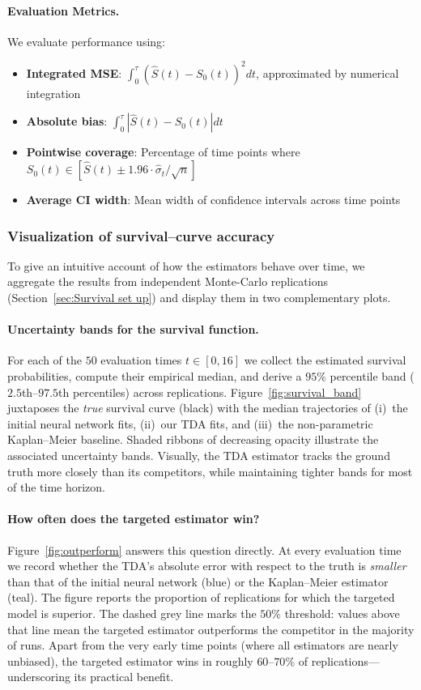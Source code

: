 \documentclass{article}
\theoremstyle{remark}
\begin{document}
\paragraph{Evaluation Metrics.}
We evaluate performance using:
\begin{itemize}[leftmargin=15pt]
\item \textbf{Integrated MSE}: $\int_0^{\tau} (\hat{S}(t) - S_0(t))^2 dt$, approximated by numerical integration
\item \textbf{Absolute bias}: $\int_0^{\tau} |\hat{S}(t) - S_0(t)| dt$
\item \textbf{Pointwise coverage}: Percentage of time points where $S_0(t) \in [\hat{S}(t) \pm 1.96 \cdot \hat{\sigma}_t / \sqrt{n}]$
\item \textbf{Average CI width}: Mean width of confidence intervals across time points
\end{itemize}

\subsubsection{Visualization of survival–curve accuracy}
\label{sec:survival_viz}

To give an intuitive account of how the estimators behave over time, we aggregate the
results from independent Monte-Carlo replications (Section~\ref{sec:Survival set up}) and
display them in two complementary plots.

\paragraph{Uncertainty bands for the survival function.}
For each of the $50$ evaluation times $t\in[0,16]$ we collect the estimated survival
probabilities, compute their empirical median, and derive a $95\%$ percentile band
($2.5$th–$97.5$th percentiles) across replications.
Figure~\ref{fig:survival_band} juxtaposes the
\emph{true} survival curve (black) with the median trajectories
of (i)~the initial neural network fits, (ii)~our TDA fits, and
(iii)~the non-parametric Kaplan–Meier baseline.
Shaded ribbons of decreasing opacity illustrate the associated
uncertainty bands.  Visually, the TDA estimator tracks the ground truth
more closely than its competitors, while maintaining tighter bands for most of the time horizon.

\paragraph{How often does the targeted estimator win?}
Figure~\ref{fig:outperform} answers this question directly.
At every evaluation time we record whether the TDA’s absolute error
with respect to the truth is \emph{smaller} than that of the initial neural network (blue)
or the Kaplan–Meier estimator (teal).  The figure reports the proportion of
replications for which the targeted model is superior.  The dashed grey line
marks the $50\%$ threshold: values above that line mean the targeted estimator
outperforms the competitor in the majority of runs.  Apart from the very early
time points (where all estimators are nearly unbiased), the targeted estimator
wins in roughly $60\!$–$70\%$ of replications—underscoring its practical benefit.
\end{document}
